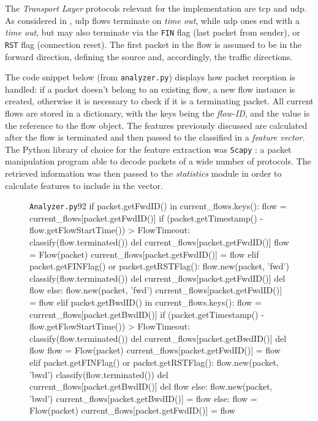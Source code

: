 The \textit{Transport Layer} protocols relevant for the implementation are \gls{tcp} and \gls{udp}. As considered in \cite{Mozley2020}, \gls{udp} flows terminate on \textit{time out}, while \gls{udp} ones end with a \textit{time out}, but may also terminate via the \texttt{FIN} flag (last packet from sender), or \texttt{RST} flag (connection reset). The first packet in the flow is assumed to be in the forward direction, defining the source and, accordingly, the traffic directions.
\par The code snippet below (from \texttt{analyzer.py}) displays how packet reception is handled: if a packet doesn't belong to an existing flow, a new flow instance is created, otherwise it is necessary to check if it is a terminating packet. All current flows are stored in a dictionary, with the keys being the \textit{flow-ID}, and the value is the reference to the flow object. The features previously discussed are calculated after the flow is terminated and then passed to the classified in a \textit{feature vector}. The Python library of choice for the feature extraction was \texttt{Scapy} \cite{ScapyLibrary}: a packet manipulation program able to decode packets of a wide number of protocols. The retrieved information was then passed to the \textit{statistics} module in order to calculate features to include in the vector.

\begin{figure}[h!]
    \begin{code}[colback=white]{\texttt{Analyzer.py}}{92}
if packet.getFwdID() in current_flows.keys():
  flow = current_flows[packet.getFwdID()]
  if (packet.getTimestamp() - flow.getFlowStartTime()) > FlowTimeout:
    classify(flow.terminated())
    del current_flows[packet.getFwdID()]
    flow = Flow(packet)
    current_flows[packet.getFwdID()] = flow
  elif packet.getFINFlag() or packet.getRSTFlag():
    flow.new(packet, 'fwd')
    classify(flow.terminated())
    del current_flows[packet.getFwdID()]
    del flow
  else:
    flow.new(packet, 'fwd')
    current_flows[packet.getFwdID()] = flow
elif packet.getBwdID() in current_flows.keys():
  flow = current_flows[packet.getBwdID()]
  if (packet.getTimestamp() - flow.getFlowStartTime()) > FlowTimeout:
    classify(flow.terminated())
    del current_flows[packet.getBwdID()]
    del flow
    flow = Flow(packet)
    current_flows[packet.getFwdID()] = flow
  elif packet.getFINFlag() or packet.getRSTFlag():
    flow.new(packet, 'bwd')
    classify(flow.terminated())
    del current_flows[packet.getBwdID()]
    del flow
  else:
    flow.new(packet, 'bwd')
    current_flows[packet.getBwdID()] = flow
else:
  flow = Flow(packet)
  current_flows[packet.getFwdID()] = flow
    \end{code}
\end{figure}

